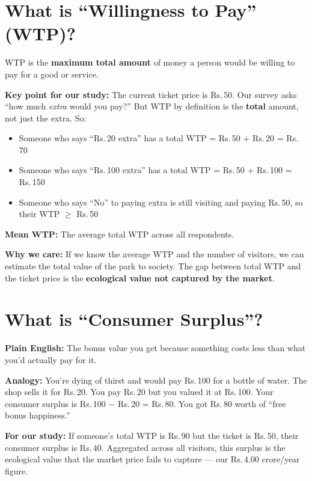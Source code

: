 \documentclass[11pt, a4paper]{article}
\newcommand{\rupee}{Rs.\,}
\begin{document}
\section{What is ``Willingness to Pay'' (WTP)?}

WTP is the \textbf{maximum total amount} of money a person would be willing to pay for a good or service.

\textbf{Key point for our study:} The current ticket price is \rupee 50. Our survey asks ``how much \textit{extra} would you pay?'' But WTP by definition is the \textbf{total} amount, not just the extra. So:
\begin{itemize}[nosep]
    \item Someone who says ``\rupee 20 extra'' has a total WTP = \rupee 50 + \rupee 20 = \rupee 70
    \item Someone who says ``\rupee 100 extra'' has a total WTP = \rupee 50 + \rupee 100 = \rupee 150
    \item Someone who says ``No'' to paying extra is still visiting and paying \rupee 50, so their WTP $\geq$ \rupee 50
\end{itemize}

\textbf{Mean WTP:} The average total WTP across all respondents.

\textbf{Why we care:} If we know the average WTP and the number of visitors, we can estimate the total value of the park to society. The gap between total WTP and the ticket price is the \textbf{ecological value not captured by the market}.

\section{What is ``Consumer Surplus''?}

\textbf{Plain English:} The bonus value you get because something costs less than what you'd actually pay for it.

\textbf{Analogy:} You're dying of thirst and would pay \rupee 100 for a bottle of water. The shop sells it for \rupee 20. You pay \rupee 20 but you valued it at \rupee 100. Your consumer surplus is \rupee 100 $-$ \rupee 20 = \rupee 80. You got \rupee 80 worth of ``free bonus happiness.''

\textbf{For our study:} If someone's total WTP is \rupee 90 but the ticket is \rupee 50, their consumer surplus is \rupee 40. Aggregated across all visitors, this surplus is the ecological value that the market price fails to capture --- our \rupee 4.00 crore/year figure.
\end{document}
